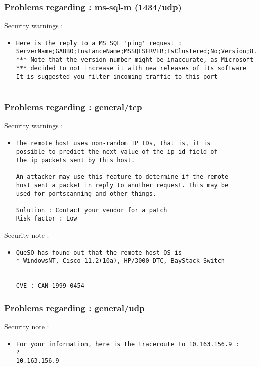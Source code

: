 \documentclass{article}
\begin{document}
\subsubsection{Problems regarding : ms-sql-m (1434/udp)}
Security warnings :\\
\begin{itemize}
\item \begin{verbatim}
Here is the reply to a MS SQL 'ping' request : ServerName;GABBO;InstanceName;MSSQLSERVER;IsClustered;No;Version;8.00.194;tcp;1433;np;\\GABBO\pipe\\sql\query;;
*** Note that the version number might be inaccurate, as Microsoft
*** decided to not increase it with new releases of its software
It is suggested you filter incoming traffic to this port


\end{verbatim}\end{itemize}
\subsubsection{Problems regarding : general/tcp}
Security warnings :\\
\begin{itemize}
\item \begin{verbatim}
The remote host uses non-random IP IDs, that is, it is
possible to predict the next value of the ip_id field of
the ip packets sent by this host.

An attacker may use this feature to determine if the remote
host sent a packet in reply to another request. This may be
used for portscanning and other things.

Solution : Contact your vendor for a patch
Risk factor : Low
\end{verbatim}\end{itemize}
Security note :\\
\begin{itemize}
\item \begin{verbatim}
QueSO has found out that the remote host OS is 
* WindowsNT, Cisco 11.2(10a), HP/3000 DTC, BayStack Switch


CVE : CAN-1999-0454
\end{verbatim}\end{itemize}
\subsubsection{Problems regarding : general/udp}
Security note :\\
\begin{itemize}
\item \begin{verbatim}
For your information, here is the traceroute to 10.163.156.9 : 
?
10.163.156.9

\end{verbatim}\end{itemize}
\end{document}
